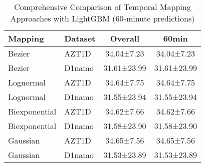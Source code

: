 \begin{table}[htbp]
\centering
\caption{Comprehensive Comparison of Temporal Mapping Approaches with LightGBM (60-minute predictions)}
\label{tab:temporal_mapping_comparison}
\begin{tabular}{llcc}
\toprule
\textbf{Mapping} & \textbf{Dataset} & \textbf{Overall} & \textbf{60min} \\
\midrule
Bezier & AZT1D & 34.04±7.23 & 34.04±7.23 \\
Bezier & D1namo & 31.61±23.99 & 31.61±23.99 \\
Lognormal & AZT1D & 34.64±7.75 & 34.64±7.75 \\
Lognormal & D1namo & 31.55±23.94 & 31.55±23.94 \\
Biexponential & AZT1D & 34.62±7.66 & 34.62±7.66 \\
Biexponential & D1namo & 31.58±23.90 & 31.58±23.90 \\
Gaussian & AZT1D & 34.65±7.56 & 34.65±7.56 \\
Gaussian & D1namo & 31.53±23.89 & 31.53±23.89 \\
\bottomrule
\end{tabular}
\end{table}
